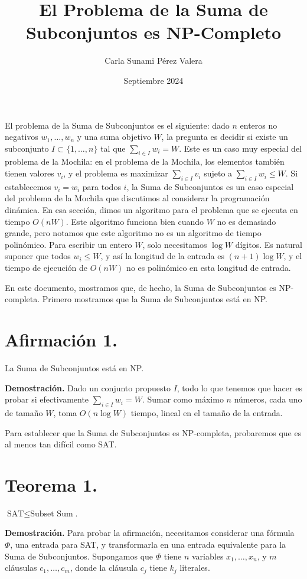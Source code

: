 \documentclass{article}
\title{El Problema de la Suma de Subconjuntos es NP-Completo}
\author{Carla Sunami Pérez Valera}
\date{Septiembre 2024}
\begin{document}
\maketitle

El problema de la Suma de Subconjuntos es el siguiente: dado \( n \) enteros no negativos \( w_1, \ldots, w_n \) y una suma objetivo \( W \), la pregunta es decidir si existe un subconjunto \( I \subset \{1, \ldots, n\} \) tal que \( \sum_{i \in I} w_i = W \). Este es un caso muy especial del problema de la Mochila: en el problema de la Mochila, los elementos también tienen valores \( v_i \), y el problema es maximizar \( \sum_{i \in I} v_i \) sujeto a \( \sum_{i \in I} w_i \leq W \). Si establecemos \( v_i = w_i \) para todos \( i \), la Suma de Subconjuntos es un caso especial del problema de la Mochila que discutimos al considerar la programación dinámica. En esa sección, dimos un algoritmo para el problema que se ejecuta en tiempo \( O(nW) \). Este algoritmo funciona bien cuando \( W \) no es demasiado grande, pero notamos que este algoritmo no es un algoritmo de tiempo polinómico. Para escribir un entero \( W \), solo necesitamos \( \log W \) dígitos. Es natural suponer que todos \( w_i \leq W \), y así la longitud de la entrada es \( (n + 1) \log W \), y el tiempo de ejecución de \( O(nW) \) no es polinómico en esta longitud de entrada.

En este documento, mostramos que, de hecho, la Suma de Subconjuntos es NP-completa. Primero mostramos que la Suma de Subconjuntos está en NP.

\section{Afirmación 1.} La Suma de Subconjuntos está en NP.

\textbf{Demostración.} Dado un conjunto propuesto \( I \), todo lo que tenemos que hacer es probar si efectivamente \( \sum_{i \in I} w_i = W \). Sumar como máximo \( n \) números, cada uno de tamaño \( W \), toma \( O(n \log W) \) tiempo, lineal en el tamaño de la entrada.

Para establecer que la Suma de Subconjuntos es NP-completa, probaremos que es al menos tan difícil como SAT.

\section{Teorema 1.} \( \text{SAT} \leq \text{Subset Sum} \).

\textbf{Demostración.} Para probar la afirmación, necesitamos considerar una fórmula \( \Phi \), una entrada para SAT, y transformarla en una entrada equivalente para la Suma de Subconjuntos. Supongamos que \( \Phi \) tiene \( n \) variables \( x_1, \ldots, x_n \), y \( m \) cláusulas \( c_1, \ldots, c_m \), donde la cláusula \( c_j \) tiene \( k_j \) literales.
\end{document}
